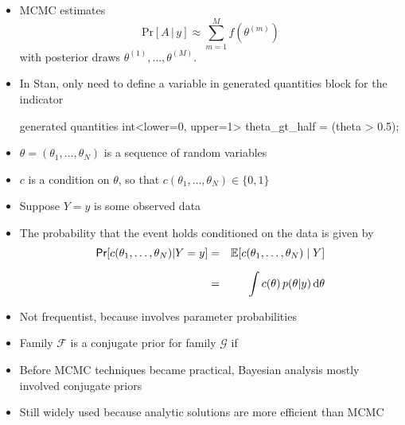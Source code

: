 \documentclass[10pt]{report}
\begin{document}
%
\begin{itemize}
\item MCMC estimates
\[
\mathrm{Pr}[A \, | \, y]
\approx
\sum_{m=1}^M f(\theta^{(m)})
\]
with posterior draws $\theta^{(1)}, \ldots, \theta^{(M)}$.
\vfill
\item In Stan, only need to define a variable in generated quantities
  block for the indicator
\begin{stancode}
generated quantities {
  int<lower=0, upper=1> theta_gt_half = (theta > 0.5);
}
\end{stancode}
\end{itemize}


%
\begin{itemize}
\item $\theta = (\theta_1, \ldots, \theta_N)$ is a sequence of
  random variables
\item $c$ is a condition on $\theta$,
  so that $c(\theta_1, \ldots, \theta_N) \in \{ 0, 1 \}$
\item Suppose $Y = y$ is some observed data
\item The probability that the event holds conditioned on the data is
  given by
%
\begin{eqnarray*}
\text{\sf Pr}[c(\theta_1, \ldots, \theta_N) | Y = y]
& = & \mathbb{E}[c(\theta_1,\ldots, \theta_N) \mid Y]
\\[6pt]
& = & \int c(\theta) \, p(\theta|y) \, \mathrm{d}\theta
\end{eqnarray*}
%
\item Not frequentist, because involves parameter probabilities
\end{itemize}




%
\begin{itemize}
\item Family $\mathcal{F}$ is a conjugate prior for family
  $\mathcal{G}$ if
\item Before MCMC techniques became practical, Bayesian analysis
  mostly involved conjugate priors
\item Still widely used because analytic solutions are more efficient
  than MCMC
\end{itemize}
\end{document}
